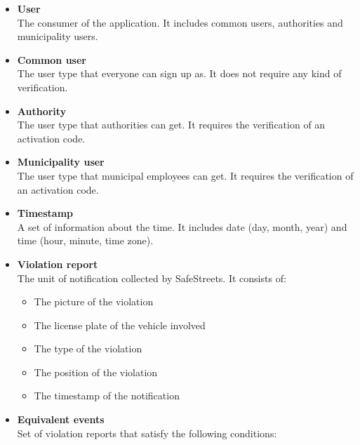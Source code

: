 \documentclass[a4paper]{article}
\begin{document}
\begin{itemize}
\item
  \textbf{User}\\
  The consumer of the application. It includes common users, authorities
  and municipality users.
\item
  \textbf{Common user}\\
  The user type that everyone can sign up as. It does not require any
  kind of verification.
\item
  \textbf{Authority}\\
  The user type that authorities can get. It requires the verification
  of an activation code.
\item
  \textbf{Municipality user}\\
  The user type that municipal employees can get. It requires the
  verification of an activation code.
\item
  \textbf{Timestamp}\\
  A set of information about the time. It includes date (day, month,
  year) and time (hour, minute, time zone).
\item
  \textbf{Violation report}\\
  The unit of notification collected by SafeStreets. It consists of:

  \begin{itemize}
  \item
    The picture of the violation
  \item
    The license plate of the vehicle involved
  \item
    The type of the violation
  \item
    The position of the violation
  \item
    The timestamp of the notification
  \end{itemize}
\item
  \textbf{Equivalent events}\\
  Set of violation reports that satisfy the following conditions:


\end{itemize}
\end{document}
